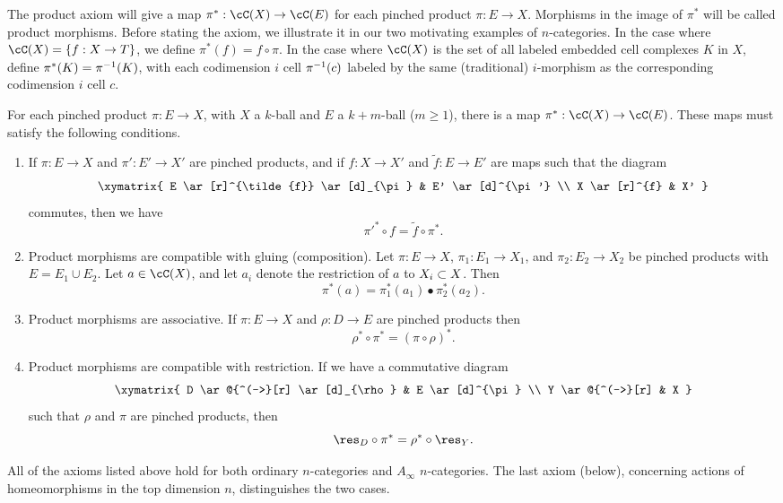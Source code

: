 The product axiom will give a map $\pi^*:\cC(X)\to \cC(E)$ for each pinched product
$\pi:E\to X$.
Morphisms in the image of $\pi^*$ will be called product morphisms.
Before stating the axiom, we illustrate it in our two motivating examples of $n$-categories.
In the case where $\cC(X) = \{f: X\to T\}$, we define $\pi^*(f) = f\circ\pi$.
In the case where $\cC(X)$ is the set of all labeled embedded cell complexes $K$ in $X$, 
define $\pi^*(K) = \pi^{-1}(K)$, with each codimension $i$ cell $\pi^{-1}(c)$ labeled by the
same (traditional) $i$-morphism as the corresponding codimension $i$ cell $c$.


\addtocounter{axiom}{-1}
\begin{axiom}
For each pinched product $\pi:E\to X$, with $X$ a $k$-ball and $E$ a $k{+}m$-ball ($m\ge 1$),
there is a map $\pi^*:\cC(X)\to \cC(E)$.
These maps must satisfy the following conditions.
\begin{enumerate}
\item
If $\pi:E\to X$ and $\pi':E'\to X'$ are pinched products, and
if $f:X\to X'$ and $\tilde{f}:E \to E'$ are maps such that the diagram
\[ \xymatrix{
	E \ar[r]^{\tilde{f}} \ar[d]_{\pi} & E' \ar[d]^{\pi'} \\
	X \ar[r]^{f} & X'
} \]
commutes, then we have 
\[
	\pi'^*\circ f = \tilde{f}\circ \pi^*.
\]
\item
Product morphisms are compatible with gluing (composition).
Let $\pi:E\to X$, $\pi_1:E_1\to X_1$, and $\pi_2:E_2\to X_2$ 
be pinched products with $E = E_1\cup E_2$.
Let $a\in \cC(X)$, and let $a_i$ denote the restriction of $a$ to $X_i\subset X$.
Then 
\[
	\pi^*(a) = \pi_1^*(a_1)\bullet \pi_2^*(a_2) .
\]
\item
Product morphisms are associative.
If $\pi:E\to X$ and $\rho:D\to E$ are pinched products then
\[
	\rho^*\circ\pi^* = (\pi\circ\rho)^* .
\]
\item
Product morphisms are compatible with restriction.
If we have a commutative diagram
\[ \xymatrix{
	D \ar@{^(->}[r] \ar[d]_{\rho} & E \ar[d]^{\pi} \\
	Y \ar@{^(->}[r] & X
} \]
such that $\rho$ and $\pi$ are pinched products, then
\[
	\res_D\circ\pi^* = \rho^*\circ\res_Y .
\]
\end{enumerate}
\end{axiom}


\medskip

All of the axioms listed above hold for both ordinary $n$-categories and $A_\infty$ $n$-categories.
The last axiom (below), concerning actions of 
homeomorphisms in the top dimension $n$, distinguishes the two cases.

